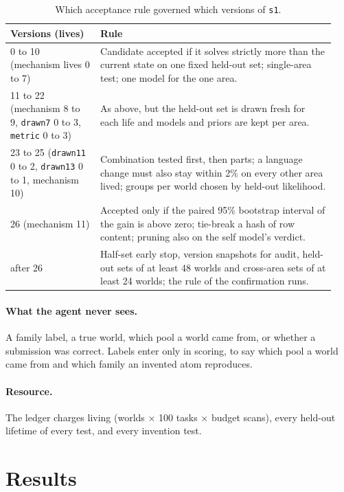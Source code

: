 \documentclass[11pt]{article}
\begin{document}
\begin{table}[h]
\centering
\caption{Which acceptance rule governed which versions of \texttt{s1}.}
\label{tab:chronology}
\small
\begin{tabular}{p{0.26\linewidth}p{0.68\linewidth}}
\toprule
Versions (lives) & Rule \\
\midrule
0 to 10 (mechanism lives 0 to 7) & Candidate accepted if it solves strictly more than the current state on one fixed held-out set; single-area test; one model for the one area. \\
11 to 22 (mechanism 8 to 9, \texttt{drawn7} 0 to 3, \texttt{metric} 0 to 3) & As above, but the held-out set is drawn fresh for each life and models and priors are kept per area. \\
23 to 25 (\texttt{drawn11} 0 to 2, \texttt{drawn13} 0 to 1, mechanism 10) & Combination tested first, then parts; a language change must also stay within 2\% on every other area lived; groups per world chosen by held-out likelihood. \\
26 (mechanism 11) & Accepted only if the paired 95\% bootstrap interval of the gain is above zero; tie-break a hash of row content; pruning also on the self model's verdict. \\
after 26 & Half-set early stop, version snapshots for audit, held-out sets of at least 48 worlds and cross-area sets of at least 24 worlds; the rule of the confirmation runs. \\
\bottomrule
\end{tabular}
\end{table}

\paragraph{What the agent never sees.} A family label, a true world, which pool a world came from, or whether a submission was correct. Labels enter only in scoring, to say which pool a world came from and which family an invented atom reproduces.

\paragraph{Resource.} The ledger charges living (worlds $\times$ 100 tasks $\times$ budget scans), every held-out lifetime of every test, and every invention test.

\section{Results}
\end{document}

